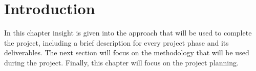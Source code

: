 \section{Introduction}
In this chapter insight is given into the approach that will be used to complete the project, including a brief description for every project phase and its deliverables. The next section will focus on the methodology that will be used during the project. Finally, this chapter will focus on the project planning.


